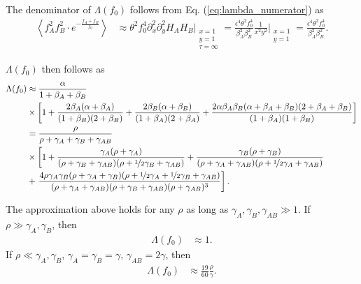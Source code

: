 \documentclass[11pt]{article}
\begin{document}
The denominator of $\Lambda(f_0)$ follows from Eq. (\ref{eq:lambda_numerator}) as 
\begin{align}
    \left\langle f_A^2f_B^2\cdot e^{-\frac{f_{A}+f_{B}}{f_0}}\right\rangle &\approx \theta^2 f_0^4 \partial_x^2 \partial_y^2 H_A H_B \Bigg\vert_{\substack{x=1 \\ y=1 \\ \tau=\infty}} = \frac{\epsilon^4 \theta^2 f_0^4}{\beta_A^2 \beta_B^2} \frac{1}{x^2y^2}\Bigg\vert_{\substack{x=1 \\ y=1}} = \frac{\epsilon^4 \theta^2 f_0^4}{\beta_A^2 \beta_B^2}.
\end{align}

$\Lambda(f_0)$ then follows as
\begin{align}\label{eq:lambda_strong_s}
    \Lambda(f_0) &\approx \frac{\alpha}{1+\beta_A + \beta_B} \\ \nonumber
    &\times \left[1 +  \frac{2\beta_A(\alpha+\beta_A)}{(1+\beta_B)(2+\beta_B)}
    +\frac{2\beta_B(\alpha+\beta_B)}{(1+\beta_A)(2+\beta_A)} + \frac{2 \alpha \beta_A \beta_B (\alpha+\beta_A+\beta_B)(2+\beta_A+\beta_B)}{(1+\beta_A)(1+\beta_B)}\right] \\ \nonumber
    &= \frac{\rho}{\rho + \gamma_A + \gamma_B + \gamma_{AB}} \\\nonumber
    &\times \left[1 +\frac{\gamma_A(\rho + \gamma_{A})}{(\rho + \gamma_B + \gamma_{AB})(\rho + \nicefrac{1}{2}\gamma_B + \gamma_{AB})} 
    +\frac{\gamma_B(\rho + \gamma_{B})}{(\rho + \gamma_A + \gamma_{AB})(\rho + \nicefrac{1}{2}\gamma_A + \gamma_{AB})} \right. \\ \nonumber
    &+\left. \frac{4 \rho \gamma_A \gamma_B (\rho+\gamma_A+\gamma_B)(\rho+\nicefrac{1}{2}\gamma_A+\nicefrac{1}{2}\gamma_B+\gamma_{AB})}{(\rho+\gamma_A+\gamma_{AB})(\rho+\gamma_B+\gamma_{AB})(\rho+\gamma_{AB})^3}\right].
\end{align}

The approximation above holds for any $\rho$ as long as $\gamma_{A}, \gamma_{B}, \gamma_{AB} \gg 1$. If $\rho \gg \gamma_A, \gamma_B$, then 
\begin{align}
    \Lambda(f_0) &\approx 1.
\end{align}
If $\rho \ll \gamma_A, \gamma_B$, $\gamma_A=\gamma_B=\gamma$, $\gamma_{AB}=2\gamma$, then
\begin{align}
    \Lambda(f_0) &\approx \frac{19}{60}\frac{\rho}{\gamma}.
\end{align} 
\end{document}
